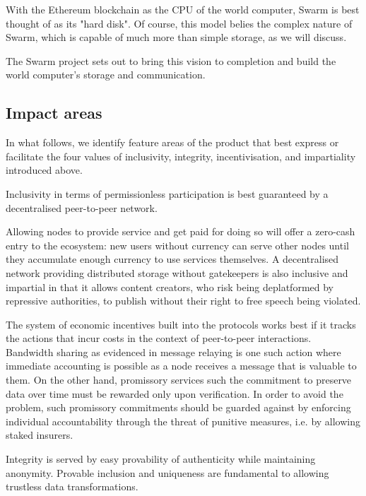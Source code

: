  
With the Ethereum blockchain as the CPU of the world computer, Swarm is best thought of as its "hard disk". Of course, this model belies the complex nature of Swarm, which is capable of much more than simple storage, as we will discuss.

The Swarm project sets out to bring this vision to completion and build the world computer's storage and communication. 

\subsection{Impact areas \statusorange}

In what follows, we identify feature areas of the product that best express or facilitate the four values of inclusivity, integrity, incentivisation, and impartiality introduced above. 

Inclusivity in terms of permissionless participation is best guaranteed by a decentralised peer-to-peer network.  

Allowing nodes to provide service and get paid for doing so will offer a zero-cash entry to the ecosystem: new users without currency can serve other nodes until they accumulate enough currency to use services themselves. A decentralised network providing distributed storage without gatekeepers is also inclusive and impartial in that it allows content creators, who risk being deplatformed by repressive  authorities, to publish without their right to free speech being violated. 

The system of economic incentives built into the protocols works best if it tracks the actions that incur costs in the context of peer-to-peer interactions. Bandwidth sharing as evidenced in message relaying is one such action where immediate accounting is possible as a node receives a message that is valuable to them. On the other hand, promissory services such the commitment to preserve data over time must be rewarded only upon verification. In order to avoid the  problem, such promissory commitments should be guarded against by enforcing individual accountability through the threat of punitive measures, i.e. by allowing staked insurers.

Integrity is served by easy provability of authenticity while maintaining anonymity.
Provable inclusion and uniqueness are fundamental to allowing trustless data transformations.


